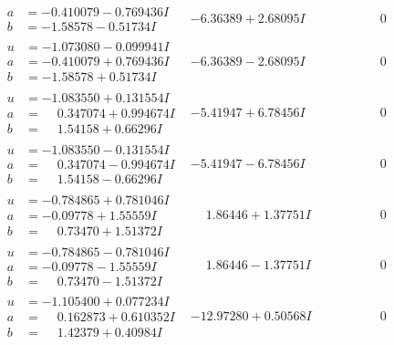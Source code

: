 \documentclass[1p]{elsarticle_modified}
\theoremstyle{definition}
\begin{document}
$$\begin{array}{c|c|c}
\begin{aligned}
a &= -0.410079 - 0.769436 I \\
b &= -1.58578 - 0.51734 I\end{aligned}
 & -6.36389 + 2.68095 I & \phantom{-0.000000 } 0 \\ \hline\begin{aligned}
u &= -1.073080 - 0.099941 I \\
a &= -0.410079 + 0.769436 I \\
b &= -1.58578 + 0.51734 I\end{aligned}
 & -6.36389 - 2.68095 I & \phantom{-0.000000 } 0 \\ \hline\begin{aligned}
u &= -1.083550 + 0.131554 I \\
a &= \phantom{-}0.347074 + 0.994674 I \\
b &= \phantom{-}1.54158 + 0.66296 I\end{aligned}
 & -5.41947 + 6.78456 I & \phantom{-0.000000 } 0 \\ \hline\begin{aligned}
u &= -1.083550 - 0.131554 I \\
a &= \phantom{-}0.347074 - 0.994674 I \\
b &= \phantom{-}1.54158 - 0.66296 I\end{aligned}
 & -5.41947 - 6.78456 I & \phantom{-0.000000 } 0 \\ \hline\begin{aligned}
u &= -0.784865 + 0.781046 I \\
a &= -0.09778 + 1.55559 I \\
b &= \phantom{-}0.73470 + 1.51372 I\end{aligned}
 & \phantom{-}1.86446 + 1.37751 I & \phantom{-0.000000 } 0 \\ \hline\begin{aligned}
u &= -0.784865 - 0.781046 I \\
a &= -0.09778 - 1.55559 I \\
b &= \phantom{-}0.73470 - 1.51372 I\end{aligned}
 & \phantom{-}1.86446 - 1.37751 I & \phantom{-0.000000 } 0 \\ \hline\begin{aligned}
u &= -1.105400 + 0.077234 I \\
a &= \phantom{-}0.162873 + 0.610352 I \\
b &= \phantom{-}1.42379 + 0.40984 I\end{aligned}
 & -12.97280 + 0.50568 I & \phantom{-0.000000 } 0 \\ \hline\begin{aligned}

\end{aligned}
\end{array}$$
\end{document}
